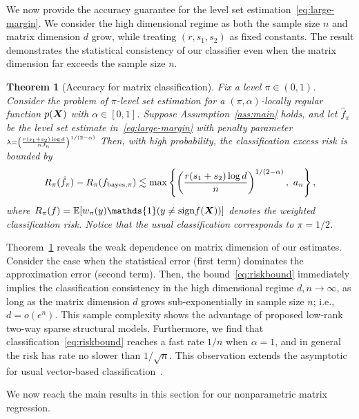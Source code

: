 \documentclass[11pt]{article}
\theoremstyle{plain}
\newtheorem{thm}{Theorem}
\theoremstyle{definition}
\def\sign{\textup{sign}}
\def\bayespif{f_{\textup{bayes},\pi}}
\begin{document}
We now provide the accuracy guarantee for the level set estimation~\eqref{eq:large-margin}. We consider the high dimensional regime as both the sample size $n$ and matrix dimension $d$ grow, while treating $(r,s_1,s_2)$ as fixed constants. The result demonstrates the statistical consistency of our classifier even when the matrix dimension far exceeds the sample size $n$. 

\begin{thm}[Accuracy for matrix classification]\label{thm:main} Fix a level $\pi\in(0,1)$. Consider the problem of $\pi$-level set estimation for a $(\pi,\alpha)$-locally regular function $p(\bm X)$ with $\alpha\in[0,1]$. Suppose Assumption~\ref{ass:main} holds, and let $\hat f_\pi$ be the level set estimate in~\eqref{eq:large-margin} with penalty parameter $\scriptstyle\lambda\asymp \left( r( s_1+s_2)\log d \over  nJ_n\right)^{1/(2-\alpha)}$ Then, with high probability, the classification excess risk is bounded by 
\begin{equation}\label{eq:riskbound}
 R_{\pi}( \hat f_\pi)-R_{\pi}(\bayespif) \lesssim \max\left\{\left({r(s_1+s_2)\log d \over n}\right)^{1/(2-\alpha)},\ a_n\right\},
\end{equation}
where $R_{\pi}(f)=\mathbb{E}[w_\pi(y)\mathds{1}(y\neq \sign f(\mX))]$ denotes the weighted classification risk. Notice that the usual classification corresponds to $\pi = 1/2$. 

\end{thm}

Theorem~\ref{thm:main} reveals the weak dependence on matrix dimension of our estimates. Consider the case when the statistical error (first term) dominates the approximation error (second term). Then, the bound~\eqref{eq:riskbound} immediately implies the classification consistency in the high dimensional regime $d,n\to \infty$, as long as the matrix dimension $d$ grows sub-exponentially in sample size $n$; i.e., $d=o(e^n)$. This sample complexity shows the advantage of proposed low-rank two-way sparse structural models. Furthermore, we find that classification~\eqref{eq:riskbound} reaches a fast rate $1/n$ when $\alpha=1$, and in general the risk has rate no slower than $1/\sqrt{n}$. This observation extends the asymptotic for usual vector-based classification~\citep{tsybakov2004optimal,shen2006discussion,audibert2007fast}. 

We now reach the main results in this section for our nonparametric matrix regression. 
\end{document}
